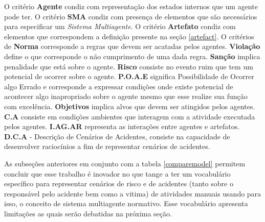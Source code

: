 O critério \textbf{Agente} condiz com representação dos estados internos que um agente pode ter. O critério \textbf{SMA} condiz com presença de elementos que são necessários para especificar um \textit{Sistema Multiagente}. O critério \textbf{Artefato} condiz com elementos que correspondem a definição presente na seção \ref{artefact}. O critérios de \textbf{Norma} corresponde a regras que devem ser acatadas pelos agentes. \textbf{Violação} define o que corresponde o não cumprimento de uma dada regra. \textbf{Sanção} implica penalidade que está sobre o agente. \textbf{Risco} consiste no evento ruim que tem um potencial de ocorrer sobre o agente. \textbf{P.O.A.E} significa Possibilidade de Ocorrer algo Errado e corresponde a expressar condições onde existe potencial de acontecer algo inapropriado sobre o agente mesmo que esse realize sua função com excelência.  \textbf{Objetivos} implica alvos que devem ser atingidos pelos agentes. \textbf{C.A} consiste em condições ambientes que interagem com a atividade executada pelos agentes. \textbf{I.AG.AR} representa as interações entre agentes e artefatos. \textbf{D.C.A} - Descrição de Cenários de Acidentes, consiste na capacidade de desenvolver raciocínios a fim de representar cenários de acidentes.

As subseções anteriores em conjunto com a tabela \ref{comparemodel} permitem concluir que esse trabalho é inovador no que tange a ter um vocabulário específico para representar cenários de risco e de acidentes (tanto sobre o responsável pelo acidente bem como a vitima) de atividades manuais usando para isso, o conceito de sistema multiagente normativo. Esse vocabulário apresenta limitações as quais serão debatidas na próxima seção. 